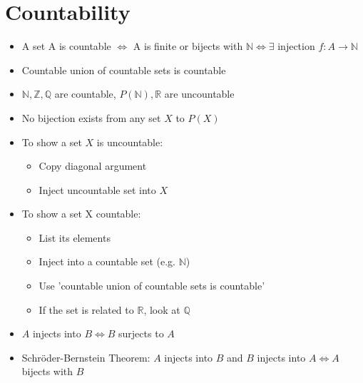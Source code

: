 \section{Countability}
\begin{itemize}
      \item A set A is countable $\iff$ A is finite or bijects with $\mathbb{N}\iff\exists$
            injection $f:A\to\mathbb{N}$
      \item Countable union of countable sets is countable
      \item $\mathbb{N},\mathbb{Z},\mathbb{Q}$ are countable, $P(\mathbb{N}),\mathbb{R}$
            are uncountable
      \item No bijection exists from any set $X$ to $P(X)$
      \item To show a set $X$ is uncountable:
            \begin{itemize}
                  \item Copy diagonal argument
                  \item Inject uncountable set into $X$
            \end{itemize}
      \item To show a set X countable:
            \begin{itemize}
                  \item List its elements
                  \item Inject into a countable set (e.g. $\mathbb{N}$)
                  \item Use 'countable union of countable sets is countable'
                  \item If the set is related to $\mathbb{R}$, look at $\mathbb{Q}$
            \end{itemize}
      \item $A$ injects into $B\iff B$ surjects to $A$
      \item Schröder-Bernstein Theorem: $A$ injects into $B$ and $B$ injects
            into $A\iff A$ bijects with $B$
\end{itemize}



